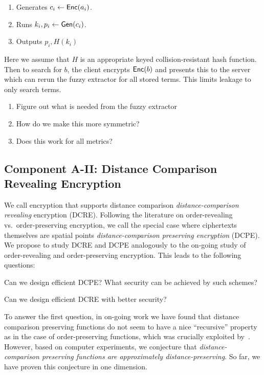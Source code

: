 \begin{enumerate}
\item Generates $c_i \leftarrow \mathsf{Enc}(a_i)$.
\item Runs $k_i, p_i \leftarrow \mathsf{Gen}(c_i)$.
\item Outputs $p_i, H(k_i)$
\end{enumerate}

Here we assume that $H$ is an appropriate keyed collision-resistant hash function.  Then to search for $b$, the client encrypts $\mathsf{Enc}(b)$ and presents this to the server which can rerun the fuzzy extractor for all stored terms.  This limits leakage to only search terms.

\begin{enumerate}
\item Figure out what is needed from the fuzzy extractor
\item How do we make this more symmetric?
\item Does this work for all metrics?
\end{enumerate}

\subsection{Component A-II: Distance Comparison Revealing Encryption}
We call encryption that supports distance comparison \emph{distance-comparison revealing} encryption (DCRE).  Following the literature on order-revealing vs.~order-preserving encryption, we call the special case where ciphertexts themselves are spatial points \emph{distance-comparison preserving encryption} (DCPE).  We propose to study DCRE and DCPE analogously to the on-going study of order-revealing and order-preserving encryption.  
This leads to the following questions:

\begin{question}
Can we design efficient DCPE?  What security can be achieved by such schemes?
\end{question}


\begin{question}
Can we design efficient DCRE with better security?
\end{question}

To answer the first question, in on-going work we have found that distance comparison preserving functions do not seem to have a nice ``recursive'' property as in the case of order-preserving functions, which was crucially exploited by~\cite{EC:BCLO09}.  However, based on computer experiments, we conjecture that \emph{distance-comparison preserving functions are approximately distance-preserving}.    So far, we have proven this conjecture in one dimension.

